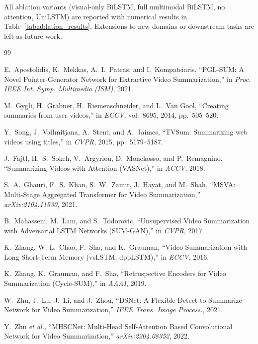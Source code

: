 \documentclass[10pt,conference]{IEEEtran}
\begin{document}
All ablation variants (visual-only BiLSTM, full multimodal BiLSTM, no
attention, UniLSTM) are reported with numerical results in
Table~\ref{tab:ablation_results}. Extensions to new domains or downstream
tasks are left as future work.



\begin{thebibliography}{99}

E.~Apostolidis, K.~Mekkas, A.~I.~Patras, and I.~Kompatsiaris,
``PGL-SUM: A Novel Pointer-Generator Network for Extractive Video
Summarization,'' in \textit{Proc. IEEE Int. Symp. Multimedia (ISM)}, 2021.

M.~Gygli, H.~Grabner, H.~Riemenschneider, and L.~Van Gool,
``Creating summaries from user videos,''
in \textit{ECCV}, vol.~8695, 2014, pp.~505--520.

Y.~Song, J.~Vallmitjana, A.~Stent, and A.~Jaimes,
``TVSum: Summarizing web videos using titles,''
in \textit{CVPR}, 2015, pp.~5179--5187.

J.~Fajtl, H.~S.~Sokeh, V.~Argyriou, D.~Monekosso, and P.~Remagnino,
``Summarizing Videos with Attention (VASNet),''
in \textit{ACCV}, 2018.

S.~A.~Ghauri, F.~S.~Khan, S.~W.~Zamir, J.~Hayat, and M.~Shah,
``MSVA: Multi-Stage Aggregated Transformer for Video Summarization,''
\textit{arXiv:2104.11530}, 2021.

B.~Mahasseni, M.~Lam, and S.~Todorovic,
``Unsupervised Video Summarization with Adversarial LSTM Networks (SUM-GAN),''
in \textit{CVPR}, 2017.

K.~Zhang, W.-L.~Chao, F.~Sha, and K.~Grauman,
``Video Summarization with Long Short-Term Memory (vsLSTM, dppLSTM),''
in \textit{ECCV}, 2016.

K.~Zhang, K.~Grauman, and F.~Sha,
``Retrospective Encoders for Video Summarization (Cycle-SUM),''
in \textit{AAAI}, 2019.

W.~Zhu, J.~Lu, J.~Li, and J.~Zhou,
``DSNet: A Flexible Detect-to-Summarize Network for Video Summarization,''
\textit{IEEE Trans. Image Process.}, 2021.

Y.~Zhu \textit{et al.},
``MHSCNet: Multi-Head Self-Attention Based Convolutional Network for Video
Summarization,'' \textit{arXiv:2204.08352}, 2022.


\end{thebibliography}
\end{document}
